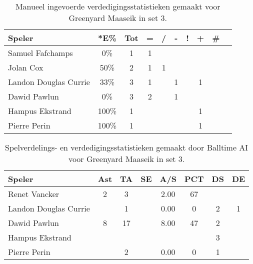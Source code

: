 \begin{table}[ht!]
    \centering
    \scriptsize
    \begin{tabular}{|l|c|c|c|c|c|c|c|c|c|} \hline
        \textbf{Speler} & *E\% & Tot & = & / & - & ! & + & \#\\ \hline
        Samuel Fafchamps & 0\% & 1 & 1 &  &  &  &  &  \\ 
        Jolan Cox & 50\% & 2 & 1 & 1 &  &  &  & \\
        Landon Douglas Currie & 33\% & 3 & 1 &  & 1 &  & 1 &  \\
        Dawid Pawlun & 0\% & 3 & 2 &  & 1 &  &  &  \\ 
        Hampus Ekstrand & 100\% & 1 &  &  &  &  & 1 &\\ 
        Pierre Perin & 100\% & 1 &  &  &  &  & 1 & \\ \hline
    \end{tabular}
    \caption[Manueel ingevoerde verdedigingsstatistieken gemaakt voor Greenyard Maaseik in set 3]{\label{tab:PL3DigMaaseikMan3}Manueel ingevoerde verdedigingsstatistieken gemaakt voor Greenyard Maaseik in set 3.}
\end{table}

\begin{table}[ht!]
  \centering
  \scriptsize
    \begin{tabular}{|l|c|c|c|c|c|c|c|} \hline
    \textbf{Speler} & Ast & TA & SE & A/S & PCT & DS & DE \\ \hline
    Renet Vancker & 2 & 3 &  & 2.00 & 67 &   &   \\
    Landon Douglas Currie &  & 1 &  & 0.00 & 0 & 2 & 1 \\
    Dawid Pawlun & 8 & 17 & & 8.00 & 47 & 2 &  \\
    Hampus Ekstrand &  &  &  &  &  & 3 &  \\
    Pierre Perin &  & 2 &  & 0.00 & 0 & 1 &  \\ \hline
  \end{tabular}
  \caption[Spelverdelings- en verdedigingsstatistieken gemaakt door Balltime AI voor Greenyard Maaseik in set 3]{\label{tab:PL3SetDigMaaseikAI3}Spelverdelings- en verdedigingsstatistieken gemaakt door Balltime AI voor Greenyard Maaseik in set 3.}
\end{table}


